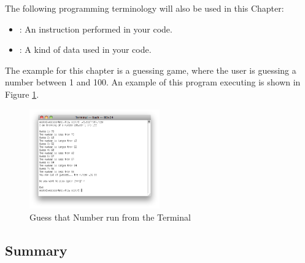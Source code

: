 The following programming terminology will also be used in this Chapter:
\begin{itemize}
  \item {}: An instruction performed in your code.
  \item {}: A kind of data used in your code.
\end{itemize}

The example for this chapter is a guessing game, where the user is guessing a number between 1 and 100. An example of this program executing is shown in Figure \ref{fig:control-flow-guess-num}.

\begin{figure}[h]
   \centering
   \includegraphics[width=0.5\textwidth]{./topics/control-flow/images/GuessThatNumber} 
   \caption[Guess That Number Terminal]{Guess that Number run from the Terminal}
   \label{fig:control-flow-guess-num}
\end{figure}





















\clearpage
\subsection{Summary} %
\label{sub:control_flow_summary}

